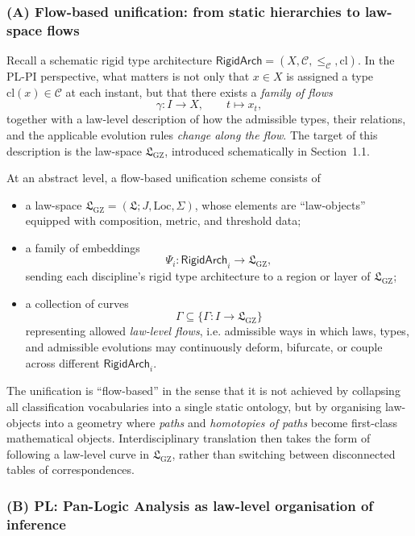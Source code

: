 \documentclass[11pt]{book}
\theoremstyle{plain}
\theoremstyle{definition}
\newcommand{\GZLS}{\ensuremath{\mathfrak{L}_{\mathrm{GZ}}}}       \newcommand{\GZLT}{\ensuremath{M_{!w}}}                           \newcommand{\GZLOC}{\ensuremath{A_M}}                             \newcommand{\GZLCurv}{\ensuremath{\mathcal{F}_{\mathrm{law}}}}
\begin{document}
\subsubsection*{(A) Flow-based unification: from static hierarchies to law-space flows}
	
Recall a schematic rigid type architecture
$\mathsf{RigidArch}=(X,\mathcal{C},\leq_{\mathcal{C}},\mathrm{cl})$.
In the PL-PI perspective, what matters is not only that $x\in X$ is
assigned a type $\mathrm{cl}(x)\in\mathcal{C}$ at each instant, but
that there exists a \emph{family of flows}
\[
  \gamma\colon I\to X,\qquad t\mapsto x_t,
\]
together with a law-level description of how the admissible types,
their relations, and the applicable evolution rules \emph{change along
the flow}. The target of this description is the law-space \GZLS,
introduced schematically in Section~1.1.

At an abstract level, a flow-based unification scheme consists of
\begin{itemize}
  \item a law-space $\GZLS=(\mathfrak{L};J,\mathrm{Loc},\Sigma)$,
        whose elements are “law-objects” equipped with composition,
        metric, and threshold data;
	  \item a family of embeddings
	        \[
	          \Psi_i\colon \mathsf{RigidArch}_i
	          \longrightarrow \GZLS,
	        \]
	        sending each discipline’s rigid type architecture
	        to a region or layer of \GZLS;
  \item a collection of curves
        \[
          \Gamma\subseteq \{\Gamma\colon I\to\GZLS\}
        \]
        representing allowed \emph{law-level flows}, i.e. admissible
        ways in which laws, types, and admissible evolutions may
	        continuously deform, bifurcate, or couple across different
	        $\mathsf{RigidArch}_i$.
\end{itemize}

The unification is “flow-based” in the sense that it is not achieved
by collapsing all classification vocabularies into a single static
ontology, but by organising law-objects into a geometry where
\emph{paths} and \emph{homotopies of paths} become first-class
mathematical objects. Interdisciplinary translation then takes the
form of following a law-level curve in $\GZLS$, rather than switching
between disconnected tables of correspondences.



\subsubsection*{(B) PL: Pan-Logic Analysis as law-level organisation of inference}
\end{document}
